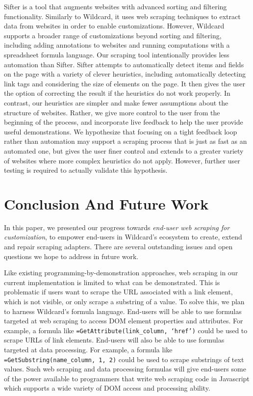 \documentclass[sigconf,10pt]{acmart}
\begin{document}
Sifter \citep{huynh2006} is a tool that augments websites with advanced
sorting and filtering functionality. Similarly to Wildcard, it uses web
scraping techniques to extract data from websites in order to enable
customizations. However, Wildcard supports a broader range of
customizations beyond sorting and filtering, including adding
annotations to websites and running computations with a spreadsheet
formula language. Our scraping tool intentionally provides less
automation than Sifter. Sifter attempts to automatically detect items
and fields on the page with a variety of clever heuristics, including
automatically detecting link tags and considering the size of elements
on the page. It then gives the user the option of correcting the result
if the heuristics do not work properly. In contrast, our heuristics are
simpler and make fewer assumptions about the structure of websites.
Rather, we give more control to the user from the beginning of the
process, and incorporate live feedback to help the user provide useful
demonstrations. We hypothesize that focusing on a tight feedback loop
rather than automation may support a scraping process that is just as
fast as an automated one, but gives the user finer control and extends
to a greater variety of websites where more complex heuristics do not
apply. However, further user testing is required to actually validate
this hypothesis.

\hypertarget{sec:conclusion}{%
\section{Conclusion And Future Work}\label{sec:conclusion}}

In this paper, we presented our progress towards \emph{end-user web
scraping for customization}, to empower end-users in Wildcard's
ecosystem to create, extend and repair scraping adapters. There are
several outstanding issues and open questions we hope to address in
future work.

Like existing programming-by-demonstration approaches, web scraping in
our current implementation is limited to what can be demonstrated. This
is problematic if users want to scrape the URL associated with a link
element, which is not visible, or only scrape a substring of a value. To
solve this, we plan to harness Wildcard's formula language. End-users
will be able to use formulas targeted at web scraping to access DOM
element properties and attributes. For example, a formula like
\texttt{=GetAttribute(link\_column,\ ‘href’)} could be used to scrape
URLs of link elements. End-users will also be able to use formulas
targeted at data processing. For example, a formula like
\texttt{=GetSubstring(name\_column,\ 1,\ 2)} could be used to scrape
substrings of text values. Such web scraping and data processing
formulas will give end-users some of the power available to programmers
that write web scraping code in Javascript which supports a wide variety
of DOM access and processing ability.
\end{document}
